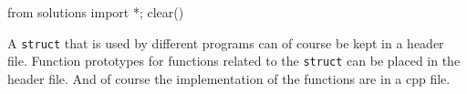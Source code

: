 \begin{python0}
from solutions import *; clear()
\end{python0}

A \texttt{struct} that is used by different programs can of course be kept in a
header file. Function prototypes for functions related to the \texttt{struct} can
be placed in the header file. And of course the implementation of the
functions are in a cpp file.



